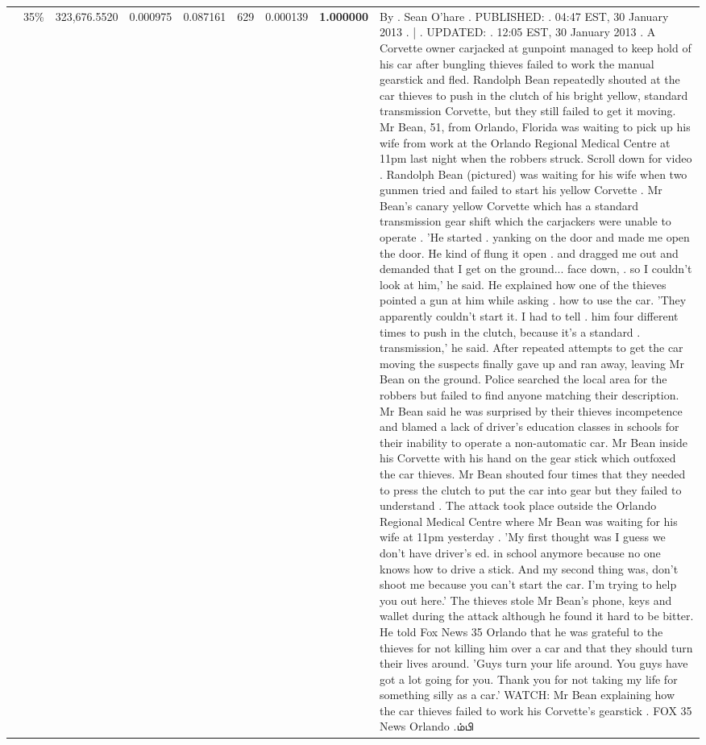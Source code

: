 \begin{table}[H]
\begin{tabular}{llrrrrrrl}
 & 35\% & 323,676.5520 & 0.000975 & 0.087161 & \color{red} 629 & 0.000139 & \bfseries \color{red} 1.000000 & By . Sean O'hare . PUBLISHED: . 04:47 EST, 30 January 2013 . | . UPDATED: . 12:05 EST, 30 January 2013 . A Corvette owner carjacked at gunpoint managed to keep hold of his car after bungling thieves failed to work the manual gearstick and fled. Randolph Bean repeatedly shouted at the car thieves to push in the clutch of his bright yellow, standard transmission Corvette, but they still failed to get it moving. Mr Bean, 51, from Orlando, Florida was waiting to pick up his wife from work at the Orlando Regional Medical Centre at 11pm last night when the robbers struck. Scroll down for video . Randolph Bean (pictured) was waiting for his wife when two gunmen tried and failed to start his yellow Corvette . Mr Bean's canary yellow Corvette which has a standard transmission gear shift which the carjackers were unable to operate . 'He started . yanking on the door and made me open the door. He kind of flung it open . and dragged me out and demanded that I get on the ground... face down, . so I couldn't look at him,' he said. He explained how one of the thieves pointed a gun at him while asking . how to use the car. 'They apparently couldn't start it. I had to tell . him four different times to push in the clutch, because it's a standard . transmission,' he said. After repeated attempts to get the car moving the suspects finally gave up and ran away, leaving Mr Bean on the ground. Police searched the local area for the robbers but failed to find anyone matching their description. Mr Bean said he was surprised by their thieves incompetence and blamed a lack of driver's education classes in schools for their inability to operate a non-automatic car. Mr Bean inside his Corvette with his hand on the gear stick which outfoxed the car thieves. Mr Bean shouted four times that they needed to press the clutch to put the car into gear but they failed to understand . The attack took place outside the Orlando Regional Medical Centre where Mr Bean was waiting for his wife at 11pm yesterday . 'My first thought was I guess we don't have driver's ed. in school anymore because no one knows how to drive a stick. And my second thing was, don't shoot me because you can't start the car. I'm trying to help you out here.' The thieves stole Mr Bean's phone, keys and wallet during the attack although he found it hard to be bitter. He told Fox News 35 Orlando that he was grateful to the thieves for not killing him over a car and that they should turn their lives around. 'Guys turn your life around. You guys have got a lot going for you. Thank you for not taking my life for something silly as a car.' WATCH: Mr Bean explaining how the car thieves failed to work his Corvette's gearstick . FOX 35 News Orlando .ம்பி \\

\end{tabular}
\end{table}
